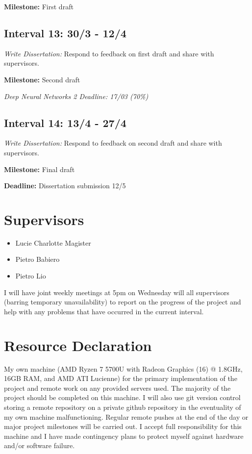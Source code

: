 \textbf{Milestone:} First draft

\subsection{Interval 13: 30/3 - 12/4}

\textit{Write Dissertation:} Respond to feedback on first draft and share with supervisors.

\textbf{Milestone:} Second draft

\textit{Deep Neural Networks 2 Deadline: 17/03 (70\%)}

\subsection{Interval 14: 13/4 - 27/4}

\textit{Write Dissertation:} Respond to feedback on second draft and share with supervisors.

\textbf{Milestone:} Final draft

\textbf{Deadline:} Dissertation submission 12/5

\section{Supervisors}

\begin{itemize}[noitemsep]
    \item Lucie Charlotte Magister
    \item Pietro Babiero
    \item Pietro Lio
\end{itemize}

I will have joint weekly meetings at 5pm on Wednesday will all supervisors (barring temporary unavailability) to report on the progress of the project and help with any problems that have occurred in the current interval. 

\section{Resource Declaration}

My own machine (AMD Ryzen 7 5700U with Radeon Graphics (16) @ 1.8GHz, 16GB RAM, and AMD ATI Lucienne) for the primary implementation of the project and remote work on any provided servers used. The majority of the project should be completed on this machine. I will also use git version control storing a remote repository on a private github repository in the eventuality of my own machine malfunctioning. Regular remote pushes at the end of the day or major project milestones will be carried out. I accept full responsibility for this machine and I have made contingency plans to protect myself against hardware and/or software failure.


